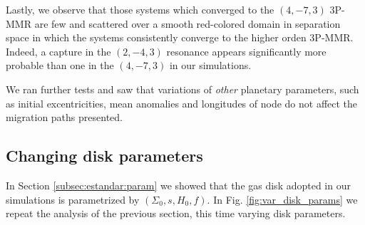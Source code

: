 \documentclass[baaa]{baaa}
\begin{document}

Lastly, we observe that those systems which converged to the $(4,-7,3)$ 3P-MMR are few and scattered over a smooth red-colored domain in separation space in which the systems consistently converge to the higher orden 3P-MMR.
Indeed, a capture in the $(2,-4,3)$ resonance appears significantly more probable than one in the $(4,-7,3)$ in our simulations.


We ran further tests and saw that variations of \textit{other} planetary parameters, such as initial excentricities, mean anomalies and longitudes of node do not affect the migration paths presented.


\subsection{Changing disk parameters}

In Section \ref{subsec:estandar:param} we showed that the gas disk adopted in our simulations is parametrized by $(\Sigma_0,s,H_0,f)$.
In Fig. \ref{fig:var_disk_params} we repeat the analysis of the previous section, this time varying disk parameters.

\end{document}

